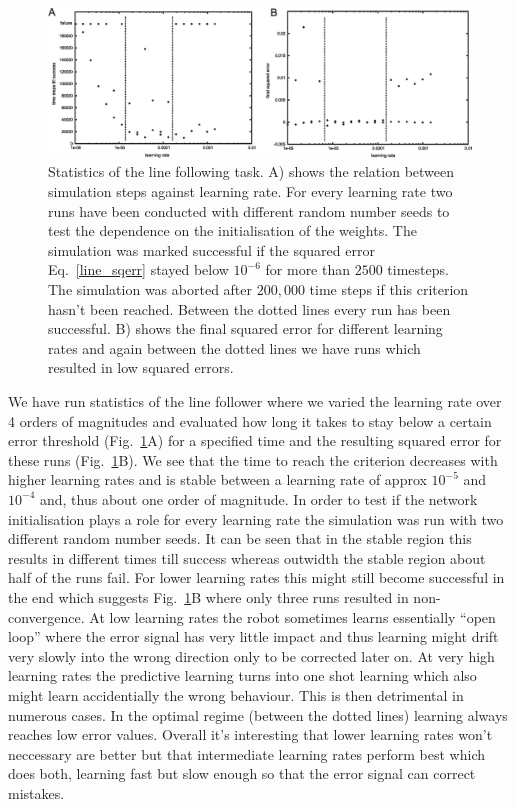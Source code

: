 \documentclass{llncs}
\begin{document}
\begin{figure}[h!]
  \centering
  \includegraphics[width=\columnwidth]{line_stats}
  \caption{Statistics of the line following task. A) shows the relation between
    simulation steps against learning rate. For every learning rate two runs have
    been conducted with different random number seeds to test the dependence on the
    initialisation of the weights. The simulation was marked successful if the
    squared error Eq.~\ref{line_sqerr} stayed below $10^{-6}$ for more than $2500$
    timesteps. The simulation was aborted after $200,000$ time steps if this criterion
    hasn't been reached. Between the dotted lines every run has been successful.
    B) shows the final squared error for different learning rates and again between
    the dotted lines we have runs which resulted in low squared errors.
    \label{line_stats}}
\end{figure}

We have run statistics of the line follower where we varied the learning
rate over 4 orders of magnitudes and evaluated how long it takes to stay
below a certain error threshold (Fig.~\ref{line_stats}A) for a specified
time and the resulting squared error for these runs (Fig.~\ref{line_stats}B).
We see that the time to reach the criterion decreases with higher learning
rates and is stable between a learning rate of approx $10^{-5}$ and $10^{-4}$ and,
thus about one order of magnitude. In order to test if the network initialisation
plays a role for every learning rate the simulation was run with two different
random number seeds. It can be seen that in the stable region this results
in different times till success whereas outwidth the stable region about
half of the runs fail. For lower learning rates this might still become successful
in the end which suggests Fig.~\ref{line_stats}B where only three runs resulted
in non-convergence. At low learning rates the robot sometimes learns essentially
``open loop'' where the error signal has very little impact and thus learning
might drift very slowly into the wrong direction only to be corrected later on.
At very high learning rates the predictive learning turns into one shot
learning which also might learn accidentially the wrong behaviour. This is
then detrimental in numerous cases. In the optimal regime (between the dotted lines)
learning always reaches low error values. Overall it's interesting that lower
learning rates won't neccessary are better but that intermediate learning rates
perform best which does both, learning fast but slow enough so that the error
signal can correct mistakes.
\end{document}
